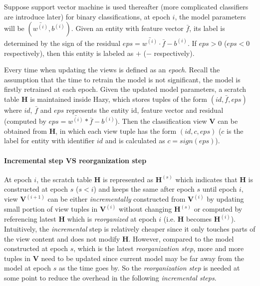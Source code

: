 Suppose support vector machine is used thereafter (more complicated classifiers are introduce later) for binary classifications, at epoch $i$, the model parameters will be $(\bar{w^{(i)}}, b^{(i)})$. Given an entity with feature vector $\bar{f}$, its label is determined by the sign of the residual $eps = \bar{w^{(i)}}\cdot\bar{f}-b^{(i)}$. If $eps > 0$ ($eps < 0$ respectively), then this entity is labeled as $+$ ($-$ respectively).

Every time when updating the views is defined as an {\em epoch}. Recall the assumption that the time to retrain the model is not significant, the model is firstly retrained at each epoch. Given the updated model parameters, a scratch table $\textbf{H}$ is maintained inside Hazy, which stores tuples of the form $(id, \bar{f}, eps)$ where $id$, $\bar{f}$ and $eps$ represents the entity id, feature vector and residual (computed by $eps = \bar{w^{(i)}}*\bar{f}-b^{(i)}$). Then the classification view $\textbf{V}$ can be obtained from $\textbf{H}$, in which each view tuple has the form $(id, c, eps)$ ($c$ is the label for entity with identifier $id$ and is calculated as $c=sign(eps)$). 

\paragraph{Incremental step VS reorganization step} At epoch $i$, the scratch table $\textbf{H}$ is represented as $\textbf{H}^{(s)}$ which indicates that $\textbf{H}$ is constructed at epoch $s$ ($s < i$) and keeps the same after epoch $s$ until epoch $i$, view $\textbf{V}^{(i+1)}$ can be either {\em incrementally} constructed from $\textbf{V}^{(i)}$ by updating small portion of view tuples in $\textbf{V}^{(i)}$ without changing $\textbf{H}^{(s)}$ or computed by referencing latest $\textbf{H}$ which is {\em reorganized} at epoch $i$ (i.e. $\textbf{H}$ becomes $\textbf{H}^{(i)}$). Intuitively, the {\em incremental} step is relatively cheaper since it only touches parts of the view content and does not modify $\textbf{H}$. However, compared to the model constructed at epoch $s$, which is the latest {\em reorganization step}, more and more tuples in $\textbf{V}$ need to be updated since current model may be far away from the model at epoch $s$ as the time goes by. So the {\em reorganization step} is needed at some point to reduce the overhead in the following {\em incremental steps}.


